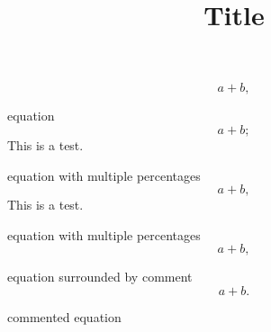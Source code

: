 \documentclass[12pt]{article}
\title{Title}
\author{}
\date{}
\begin{document}

%
\begin{equation}
  a+b
  ,
\end{equation}
%

equation
%
\begin{equation}
  a+b
  ;
\end{equation}
%
This is a test.

equation with multiple percentages
%
\begin{equation}
  a+b
  ,
\end{equation}
%
This is a test.

equation with multiple percentages
%
\begin{equation}
  a+b
  ,
\end{equation}
%

equation surrounded by comment
%
\begin{equation}
  a+b
  .
\end{equation}
%

commented equation
\end{document}
